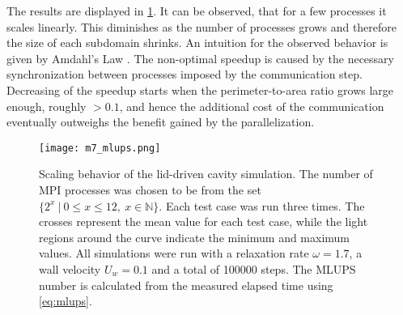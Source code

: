 The results are displayed in \cref{fig:lid:scaling}. It can be observed, that for a few processes it scales linearly. This diminishes as the number of processes grows and therefore the size of each subdomain shrinks. An intuition for the observed behavior is given by Amdahl's Law \cite{amdahl}. The non-optimal speedup is caused by the necessary synchronization between processes imposed by the communication step. Decreasing of the speedup starts when the perimeter-to-area ratio grows large enough, roughly $>0.1$, and hence the additional cost of the communication eventually outweighs the benefit gained by the parallelization.

\begin{figure}[ht!]
    \centering
    \texttt{[image: m7\_mlups.png]}
    \caption[Scaling behavior of the lid-driven cavity simulation]{Scaling behavior of the lid-driven cavity simulation. The number of MPI processes was chosen to be from the set $\{2^x~|~0 \le x \le 12,~ x \in \mathbb{N}\}$. Each test case was run three times. The crosses represent the mean value for each test case, while the light regions around the curve indicate the minimum and maximum values. All simulations were run with a relaxation rate $\omega=1.7$, a wall velocity $U_w=0.1$ and a total of 100000 steps. The \gls{MLUPS} number is calculated from the measured elapsed time using \cref{eq:mlups}.}
    \label{fig:lid:scaling}
\end{figure}
